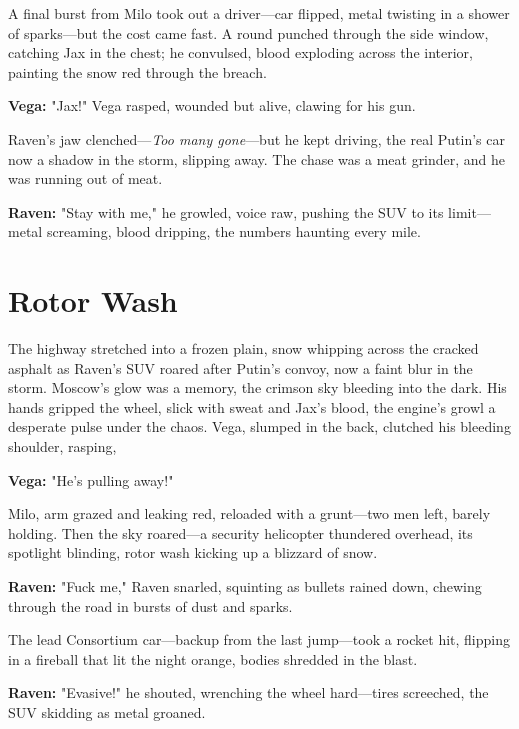 \documentclass[12pt]{book}
\begin{document}
A final burst from Milo took out a driver—car flipped, metal twisting in a shower of sparks—but the cost came fast. A round punched through the side window, catching Jax in the chest; he convulsed, blood exploding across the interior, painting the snow red through the breach.

\vspace{0.5em}
\textbf{Vega:} "Jax!" Vega rasped, wounded but alive, clawing for his gun.

Raven’s jaw clenched—\textit{Too many gone}—but he kept driving, the real Putin’s car now a shadow in the storm, slipping away. The chase was a meat grinder, and he was running out of meat.

\vspace{0.5em}
\textbf{Raven:} "Stay with me," he growled, voice raw, pushing the SUV to its limit—metal screaming, blood dripping, the numbers haunting every mile.

\vspace{1em}

\section{Rotor Wash}

The highway stretched into a frozen plain, snow whipping across the cracked asphalt as Raven’s SUV roared after Putin’s convoy, now a faint blur in the storm. Moscow’s glow was a memory, the crimson sky bleeding into the dark. His hands gripped the wheel, slick with sweat and Jax’s blood, the engine’s growl a desperate pulse under the chaos. Vega, slumped in the back, clutched his bleeding shoulder, rasping,

\vspace{0.5em}
\textbf{Vega:} "He’s pulling away!"

Milo, arm grazed and leaking red, reloaded with a grunt—two men left, barely holding. Then the sky roared—a security helicopter thundered overhead, its spotlight blinding, rotor wash kicking up a blizzard of snow.

\vspace{0.5em}
\textbf{Raven:} "Fuck me," Raven snarled, squinting as bullets rained down, chewing through the road in bursts of dust and sparks.

The lead Consortium car—backup from the last jump—took a rocket hit, flipping in a fireball that lit the night orange, bodies shredded in the blast.

\vspace{0.5em}
\textbf{Raven:} "Evasive!" he shouted, wrenching the wheel hard—tires screeched, the SUV skidding as metal groaned.
\end{document}
